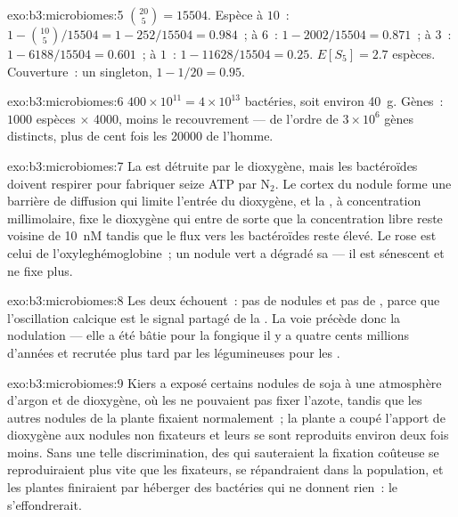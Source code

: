 \begin{solution}{exo:b3:microbiomes:5}
$\binom{20}{5} = \num{15504}$. Espèce à $10$~: $1 - \binom{10}{5}/
\num{15504} = 1 - 252/\num{15504} = 0.984$~; à $6$~: $1 - 2002/\num{15504}
= 0.871$~; à $3$~: $1 - 6188/\num{15504} = 0.601$~; à $1$~: $1 -
\num{11628}/\num{15504} = 0.25$. $E[S_{5}] = 2.7$ espèces. Couverture~:
un singleton, $1 - 1/20 = 0.95$.
\end{solution}

\begin{solution}{exo:b3:microbiomes:6}
$400\times 10^{11} = 4\times 10^{13}$ bactéries, soit environ
\qty{40}{g}. Gènes~: $1000$ espèces $\times$ \num{4000}, moins le
recouvrement --- de l'ordre de $3\times 10^{6}$ gènes distincts, plus de
cent fois les \num{20000} de l'homme.
\end{solution}

\begin{solution}{exo:b3:microbiomes:7}
La  est détruite par le dioxygène, mais les bactéroïdes
doivent respirer pour fabriquer seize ATP par N$_{2}$. Le cortex du
nodule forme une barrière de diffusion qui limite l'entrée du
dioxygène, et la , à concentration millimolaire, fixe le
dioxygène qui entre de sorte que la concentration libre reste voisine
de \qty{10}{nM} tandis que le flux vers les bactéroïdes reste élevé. Le
rose est celui de l'oxyleghémoglobine~; un nodule vert a dégradé sa
 --- il est sénescent et ne fixe plus.
\end{solution}

\begin{solution}{exo:b3:microbiomes:8}
Les deux échouent~: pas de nodules et pas de ,
parce que l'oscillation calcique est le signal partagé de la . La voie précède donc la nodulation --- elle a été
bâtie pour la  fongique il y a quatre cents millions d'années
et recrutée plus tard par les légumineuses pour les .
\end{solution}

\begin{solution}{exo:b3:microbiomes:9}
Kiers a exposé certains nodules de soja à une atmosphère d'argon et de
dioxygène, où les  ne pouvaient pas fixer l'azote, tandis que
les autres nodules de la plante fixaient normalement~; la plante a
coupé l'apport de dioxygène aux nodules non fixateurs et leurs
 se sont reproduits environ deux fois moins. Sans une telle
discrimination, des  qui sauteraient la fixation coûteuse se
reproduiraient plus vite que les fixateurs, se répandraient dans la
population, et les plantes finiraient par héberger des bactéries qui ne
donnent rien~: le  s'effondrerait.
\end{solution}

